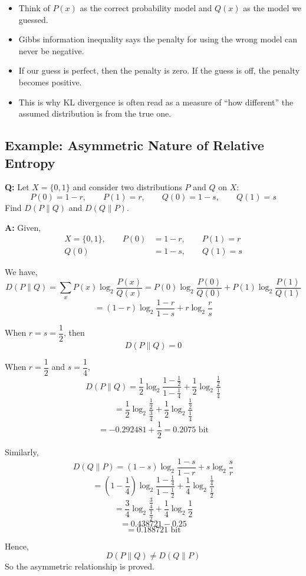 \documentclass[11pt,a4paper]{book}
\newenvironment{infobox}[1][Information]{%
    \begin{tcolorbox}[
        enhanced,
        breakable,
        colback=mintgreen!10,
        colframe=mintgreen!200,
        title=#1,
        fonttitle=\bfseries,
        sharp corners,
        boxrule=0.8pt,
        left=8pt,
        right=8pt,
        top=6pt,
        bottom=6pt
    ]
}{\end{tcolorbox}}
\newcounter{qna}[chapter]
\renewcommand{\theqna}{\thechapter.\arabic{qna}}
\newenvironment{questionanswerbox}[1][Example]{%
    \refstepcounter{qna}
    \begin{tcolorbox}[
        enhanced,
        breakable,
        colback=softlavender!10,
        colframe=softlavender!200,
        title={#1~\theqna},
        fonttitle=\bfseries,
        coltitle=white,
        colbacktitle=softlavender!200,
        sharp corners,
        boxrule=1pt,
        left=8pt,
        right=8pt,
        top=6pt,
        bottom=6pt
    ]
}{\end{tcolorbox}}
\begin{document}
\begin{infobox}[First-Timer Takeaway]
\begin{itemize}
    \item Think of $P(x)$ as the correct probability model and $Q(x)$ as the model we guessed.
    \item Gibbs information inequality says the penalty for using the wrong model can never be negative.
    \item If our guess is perfect, then the penalty is zero. If the guess is off, the penalty becomes positive.
    \item This is why KL divergence is often read as a measure of ``how different'' the assumed distribution is from the true one.
\end{itemize}
\end{infobox}

\clearpage

\subsection{Example: Asymmetric Nature of Relative Entropy}

\begin{questionanswerbox}[Example]
\textbf{Q:} Let $X=\{0,1\}$ and consider two distributions $P$ and $Q$ on $X$:
\[
P(0)=1-r,\qquad P(1)=r,\qquad Q(0)=1-s,\qquad Q(1)=s
\]
Find $D(P \parallel Q)$ and $D(Q \parallel P)$.

\textbf{A:} Given,
\begin{align*}
    X=\{0,1\}, \qquad P(0)&=1-r,\qquad P(1)=r\\
    Q(0)&=1-s,\qquad Q(1)=s
\end{align*}

We have,
\[
D(P \parallel Q)
= \sum_x P(x)\log_2 \frac{P(x)}{Q(x)}
= P(0)\log_2\frac{P(0)}{Q(0)} + P(1)\log_2\frac{P(1)}{Q(1)}
\]
\[
= (1-r)\log_2\frac{1-r}{1-s} + r\log_2\frac{r}{s}
\]

When $r=s=\dfrac{1}{2}$, then
\[
D(P \parallel Q)=0
\]

When $r=\dfrac{1}{2}$ and $s=\dfrac{1}{4}$,
\[
D(P \parallel Q)
= \frac{1}{2}\log_2\frac{1-\frac{1}{2}}{1-\frac{1}{4}}
+ \frac{1}{2}\log_2\frac{\frac{1}{2}}{\frac{1}{4}}
\]
\[
= \frac{1}{2}\log_2\frac{\frac{1}{2}}{\frac{3}{4}}
+ \frac{1}{2}\log_2\frac{\frac{1}{2}}{\frac{1}{4}}
\]
\[
= -0.292481 + \frac{1}{2}
= 0.2075 \text{ bit}
\]

Similarly,
\[
D(Q \parallel P)
= (1-s)\log_2\frac{1-s}{1-r} + s\log_2\frac{s}{r}
\]
\[
= \left(1-\frac{1}{4}\right)\log_2\frac{1-\frac{1}{4}}{1-\frac{1}{2}}
+ \frac{1}{4}\log_2\frac{\frac{1}{4}}{\frac{1}{2}}
\]
\[
= \frac{3}{4}\log_2\frac{\frac{3}{4}}{\frac{1}{2}}
+ \frac{1}{4}\log_2\frac{1}{2}
\]
\[
= 0.438721 - 0.25
\]
\[
= 0.188721 \text{ bit}
\]

Hence,
\[
D(P \parallel Q) \ne D(Q \parallel P)
\]
So the asymmetric relationship is proved.
\end{questionanswerbox}
\end{document}
